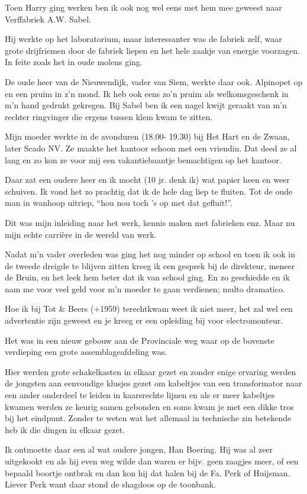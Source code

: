 \documentclass[10pt,twoside,openright]{memoir}
\begin{document}
Toen Harry ging werken ben ik ook nog wel eens met hem mee geweest naar Verffabriek A.W. Sabel. 

Hij werkte op het laboratorium, maar interessanter was de fabriek zelf, waar grote drijfriemen door de fabriek liepen en het hele zaakje van energie voorzagen. In feite zoals het in oude molens ging.

De oude heer van de Nieuwendijk, vader van Siem, werkte daar ook. Alpinopet op en een pruim in z’n mond. Ik heb ook eens zo’n pruim als welkomsgeschenk in m’n hand gedrukt gekregen. Bij Sabel ben ik een nagel kwijt geraakt van m’n rechter ringvinger die ergens tussen klem kwam te zitten.

Mijn moeder werkte in de avonduren (18.00- 19.30) bij Het Hart en de Zwaan, later Scado NV. Ze maakte het kantoor schoon met een vriendin. Dat deed ze al lang en zo kon ze voor mij een vakantiebaantje bemachtigen op het kantoor. 

Daar zat een oudere heer en ik mocht (10 jr. denk ik) wat papier heen en weer schuiven. Ik vond het zo prachtig dat ik de hele dag liep te fluiten. Tot de oude man in wanhoop uitriep, “hou nou toch ’s op met dat gefluit!”.

Dit was mijn inleiding naar het werk, kennis maken met fabrieken enz. Maar nu mijn echte carrière in de wereld van werk.

Nadat m’n vader overleden was ging het nog minder op school en toen ik ook in de tweede dreigde te blijven zitten kreeg ik een gesprek bij de direkteur, meneer de Bruin, en het leek hem beter dat ik van school ging. En zo geschiedde en ik nam me voor veel geld voor m’n moeder te gaan verdienen; multo dramatico.

Hoe ik bij Tot \& Beers (+1959) terechtkwam weet ik niet meer, het zal wel een advertentie zijn geweest en je kreeg er een opleiding bij voor electromonteur.

Het was in een nieuw gebouw aan de Provinciale weg waar op de bovenste verdieping een grote assemblageafdeling was. 

Hier werden grote schakelkasten in elkaar gezet en zonder enige ervaring werden de jongsten aan eenvoudige klusjes gezet om kabeltjes van een transformator naar een ander onderdeel te leiden in kaarsrechte lijnen en als er meer kabeltjes kwamen werden ze keurig samen gebonden en soms kwam je met een dikke tros bij het eindpunt. Zonder te weten wat het allemaal in technische zin betekende heb ik die dingen in elkaar gezet. 

Ik ontmoette daar een al wat oudere jongen, Han Boering. Hij was al zeer uitgekookt en als hij even weg wilde dan waren er bijv. geen zaagjes meer, of een bepaald boortje ontbrak en dan kon hij dat halen bij de Fa. Perk of Huijsman. Liever Perk want daar stond de shagdoos op de toonbank. 
\end{document}
